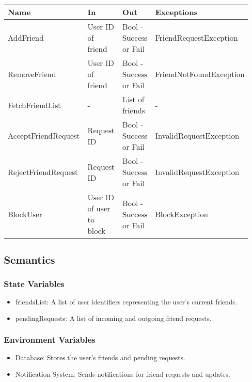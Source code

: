 \documentclass[12pt, titlepage]{article}
\begin{document}
\begin{center}
  \begin{tabular}{p{4cm} p{4cm} p{4cm} p{4cm}}
    \hline
    \textbf{Name}       & \textbf{In}              & \textbf{Out}           & \textbf{Exceptions}     \\
    \hline
    AddFriend           & User ID of friend        & Bool - Success or Fail & FriendRequestException  \\
    \hline
    RemoveFriend        & User ID of friend        & Bool - Success or Fail & FriendNotFoundException \\
    \hline
    FetchFriendList     & -                        & List of friends        & -                       \\
    \hline
    AcceptFriendRequest & Request ID               & Bool - Success or Fail & InvalidRequestException \\
    \hline
    RejectFriendRequest & Request ID               & Bool - Success or Fail & InvalidRequestException \\
    \hline
    BlockUser           & User ID of user to block & Bool - Success or Fail & BlockException          \\
    \hline
  \end{tabular}
\end{center}


\subsection{Semantics}

\subsubsection{State Variables}

\begin{itemize}
  \item friendsList: A list of user identifiers representing the user's current friends.
  \item pendingRequests: A list of incoming and outgoing friend requests.
\end{itemize}

\subsubsection{Environment Variables}

\begin{itemize}
  \item Database: Stores the user’s friends and pending requests.
  \item Notification System: Sends notifications for friend requests and updates.
\end{itemize}
\end{document}
